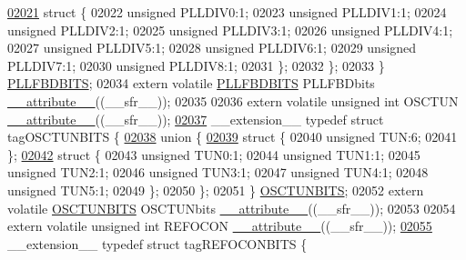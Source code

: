 \begin{DoxyCode}
\hypertarget{a00015_source_l02021}{}\hyperlink{a00015}{02021}     \textcolor{keyword}{struct }\{
02022       \textcolor{keywordtype}{unsigned} PLLDIV0:1;
02023       \textcolor{keywordtype}{unsigned} PLLDIV1:1;
02024       \textcolor{keywordtype}{unsigned} PLLDIV2:1;
02025       \textcolor{keywordtype}{unsigned} PLLDIV3:1;
02026       \textcolor{keywordtype}{unsigned} PLLDIV4:1;
02027       \textcolor{keywordtype}{unsigned} PLLDIV5:1;
02028       \textcolor{keywordtype}{unsigned} PLLDIV6:1;
02029       \textcolor{keywordtype}{unsigned} PLLDIV7:1;
02030       \textcolor{keywordtype}{unsigned} PLLDIV8:1;
02031     \};
02032   \};
02033 \} \hyperlink{a00014_d9/d0f/a00644}{PLLFBDBITS};
02034 \textcolor{keyword}{extern} \textcolor{keyword}{volatile} \hyperlink{a00014_d9/d0f/a00644}{PLLFBDBITS} PLLFBDbits \hyperlink{a00015_a493c46f03454991ccc5aa7a6e1dfb2a7}{\_\_attribute\_\_}((\_\_sfr\_\_));
02035 
02036 \textcolor{keyword}{extern} \textcolor{keyword}{volatile} \textcolor{keywordtype}{unsigned} \textcolor{keywordtype}{int}  OSCTUN \hyperlink{a00015_a493c46f03454991ccc5aa7a6e1dfb2a7}{\_\_attribute\_\_}((\_\_sfr\_\_));
\hypertarget{a00015_source_l02037}{}\hyperlink{a00014}{02037} \_\_extension\_\_ \textcolor{keyword}{typedef} \textcolor{keyword}{struct }tagOSCTUNBITS \{
\hypertarget{a00015_source_l02038}{}\hyperlink{a00015}{02038}   \textcolor{keyword}{union }\{
\hypertarget{a00015_source_l02039}{}\hyperlink{a00015}{02039}     \textcolor{keyword}{struct }\{
02040       \textcolor{keywordtype}{unsigned} TUN:6;
02041     \};
\hypertarget{a00015_source_l02042}{}\hyperlink{a00015}{02042}     \textcolor{keyword}{struct }\{
02043       \textcolor{keywordtype}{unsigned} TUN0:1;
02044       \textcolor{keywordtype}{unsigned} TUN1:1;
02045       \textcolor{keywordtype}{unsigned} TUN2:1;
02046       \textcolor{keywordtype}{unsigned} TUN3:1;
02047       \textcolor{keywordtype}{unsigned} TUN4:1;
02048       \textcolor{keywordtype}{unsigned} TUN5:1;
02049     \};
02050   \};
02051 \} \hyperlink{a00014_db/d3a/a00641}{OSCTUNBITS};
02052 \textcolor{keyword}{extern} \textcolor{keyword}{volatile} \hyperlink{a00014_db/d3a/a00641}{OSCTUNBITS} OSCTUNbits \hyperlink{a00015_a493c46f03454991ccc5aa7a6e1dfb2a7}{\_\_attribute\_\_}((\_\_sfr\_\_));
02053 
02054 \textcolor{keyword}{extern} \textcolor{keyword}{volatile} \textcolor{keywordtype}{unsigned} \textcolor{keywordtype}{int}  REFOCON \hyperlink{a00015_a493c46f03454991ccc5aa7a6e1dfb2a7}{\_\_attribute\_\_}((\_\_sfr\_\_));
\hypertarget{a00015_source_l02055}{}\hyperlink{a00014}{02055} \_\_extension\_\_ \textcolor{keyword}{typedef} \textcolor{keyword}{struct }tagREFOCONBITS \{

\end{DoxyCode}
